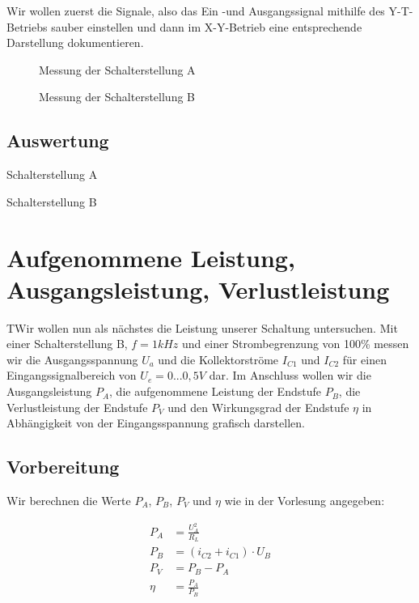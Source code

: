 \documentclass{article}
\begin{document}
Wir wollen zuerst die Signale, also das Ein -und Ausgangssignal mithilfe des Y-T-Betriebs sauber einstellen und dann im X-Y-Betrieb eine entsprechende Darstellung dokumentieren.

\begin{figure}[h]
  \centering

  \caption{Messung der Schalterstellung A}
  \label{fig:schaltAlissa}
\end{figure}

\begin{figure}[h]
  \centering

  \caption{Messung der Schalterstellung B}
  \label{fig:schaltBlissa}
\end{figure}

\subsection{Auswertung}
\label{sec:auswertung-1}

Schalterstellung A

Schalterstellung B



\section{Aufgenommene Leistung, Ausgangsleistung, Verlustleistung}
\label{sec:aufg-leist-ausg}

\begin{task}
  TWir wollen nun als nächstes die Leistung unserer Schaltung untersuchen. Mit einer Schalterstellung B, $f=1kHz$ und einer Strombegrenzung von 100\% messen wir die Ausgangsspannung $U_{a}$ und die Kollektorströme $I_{C1}$ und $I_{C2}$ für einen Eingangssignalbereich von $U_{e} = 0...0,5V$ dar. Im Anschluss wollen wir die Ausgangsleistung $P_{A}$, die aufgenommene Leistung der Endstufe $P_{B}$, die Verlustleistung der Endstufe $P_{V}$ und den Wirkungsgrad der Endstufe $\eta$ in Abhängigkeit von der Eingangsspannung grafisch darstellen.
\end{task}

\subsection{Vorbereitung}
\label{sec:vorbereitung-2}

Wir berechnen die Werte $P_{A}$, $P_{B}$, $P_{V}$ und $\eta$ wie in der Vorlesung angegeben:

\begin{align*}
  P_{A} &= \frac{U_{A}^{2}}{R_{L}}\\
  P_{B} &= (i_{C2} + i_{C1})\cdot U_{B}\\
  P_{V} &= P_{B} - P_{A}\\
  \eta &= \frac{P_{A}}{P_{B}}\\
\end{align*}
\end{document}
